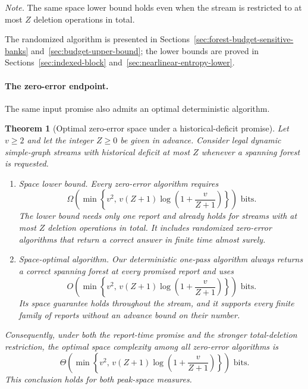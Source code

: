 \documentclass[11pt,letterpaper]{article}
\newtheorem{theorem}{Theorem}[section]
\numberwithin{equation}{section}
\begin{document}
\noindent\emph{Note.} The same space lower bound holds even when the stream is restricted to at most $Z$ deletion operations in total.

The randomized algorithm is presented in Sections~\ref{sec:forest-budget-sensitive-banks} and~\ref{sec:budget-upper-bound}; the lower bounds are proved in Sections~\ref{sec:indexed-block} and~\ref{sec:nearlinear-entropy-lower}.

\paragraph{The zero-error endpoint.}
The same input promise also admits an optimal deterministic algorithm.

\begin{theorem}[Optimal zero-error space under a historical-deficit promise]
\label{thm:zero-error-lower}
\label{thm:zero-error-space}
Let $v\ge2$ and let the integer $Z\ge0$ be given in advance.
Consider legal dynamic simple-graph streams with historical deficit at most $Z$ whenever a spanning forest is requested.
\begin{enumerate}
\item \emph{Space lower bound.} Every zero-error algorithm requires
\[
\Omega\!\left(\min\left\{v^2,\,v(Z+1)\log\!\left(1+\frac{v}{Z+1}\right)\right\}\right)\text{ bits}.
\]
The lower bound needs only one report and already holds for streams with at most $Z$ deletion operations in total.
It includes randomized zero-error algorithms that return a correct answer in finite time almost surely.
\item \emph{Space-optimal algorithm.} Our deterministic one-pass algorithm always returns a correct spanning forest at every promised report and uses
\begin{equation}
O\!\left(\min\left\{v^2,\,v(Z+1)\log\!\left(1+\frac{v}{Z+1}\right)\right\}\right)\text{ bits}.
\label{eq:graph-simple-exact}
\end{equation}
Its space guarantee holds throughout the stream, and it supports every finite family of reports without an advance bound on their number.
\end{enumerate}
Consequently, under both the report-time promise and the stronger total-deletion restriction, the optimal space complexity among all zero-error algorithms is
\[
\Theta\!\left(\min\left\{v^2,\,v(Z+1)\log\!\left(1+\frac{v}{Z+1}\right)\right\}\right)\text{ bits}.
\]
This conclusion holds for both peak-space measures.
\end{theorem}
\end{document}
